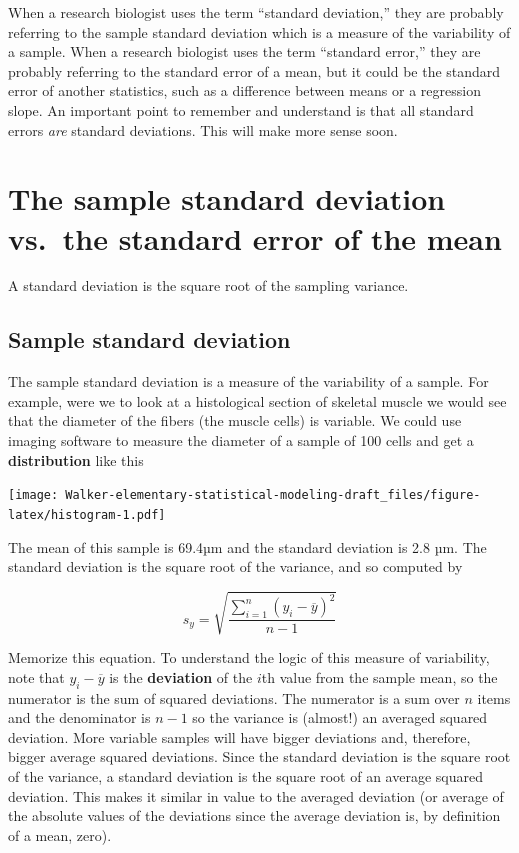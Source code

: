 \documentclass[]{book}
\begin{document}
When a research biologist uses the term ``standard deviation,'' they are probably referring to the sample standard deviation which is a measure of the variability of a sample. When a research biologist uses the term ``standard error,'' they are probably referring to the standard error of a mean, but it could be the standard error of another statistics, such as a difference between means or a regression slope. An important point to remember and understand is that all standard errors \emph{are} standard deviations. This will make more sense soon.

\hypertarget{the-sample-standard-deviation-vs.-the-standard-error-of-the-mean}{%
\section{The sample standard deviation vs.~the standard error of the mean}\label{the-sample-standard-deviation-vs.-the-standard-error-of-the-mean}}

A standard deviation is the square root of the sampling variance.

\hypertarget{sample-standard-deviation}{%
\subsection{Sample standard deviation}\label{sample-standard-deviation}}

The sample standard deviation is a measure of the variability of a sample. For example, were we to look at a histological section of skeletal muscle we would see that the diameter of the fibers (the muscle cells) is variable. We could use imaging software to measure the diameter of a sample of 100 cells and get a \textbf{distribution} like this

\texttt{[image: Walker-elementary-statistical-modeling-draft\_files/figure-latex/histogram-1.pdf]}

The mean of this sample is 69.4µm and the standard deviation is 2.8 µm. The standard deviation is the square root of the variance, and so computed by

\begin{equation}
s_y = \sqrt{\frac{\sum_{i=1}^n{(y_i - \overline{y})^2}}{n-1}}
\label{eq:variance}
\end{equation}

Memorize this equation. To understand the logic of this measure of variability, note that \(y_i - \overline{y}\) is the \textbf{deviation} of the \(i\)th value from the sample mean, so the numerator is the sum of squared deviations. The numerator is a sum over \(n\) items and the denominator is \(n-1\) so the variance is (almost!) an averaged squared deviation. More variable samples will have bigger deviations and, therefore, bigger average squared deviations. Since the standard deviation is the square root of the variance, a standard deviation is the square root of an average squared deviation. This makes it similar in value to the averaged deviation (or average of the absolute values of the deviations since the average deviation is, by definition of a mean, zero).
\end{document}
